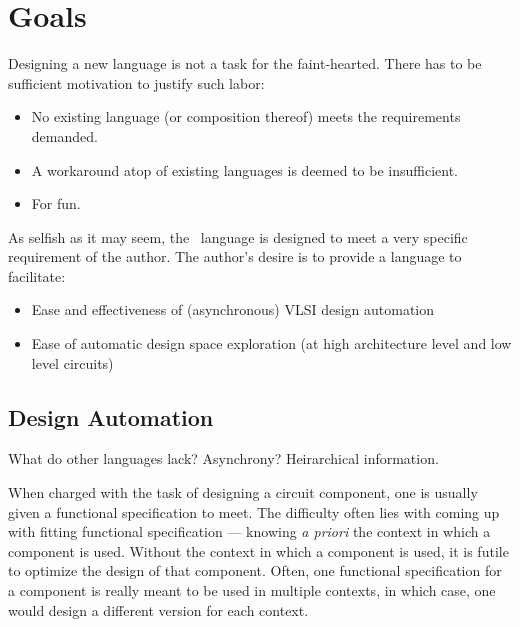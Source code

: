 

\chapter{Goals}
\label{sec:goals}

Designing a new language is not a task for the faint-hearted.  
There has to be sufficient motivation to justify such labor:

\begin{itemize}
\item No existing language (or composition thereof)
	meets the requirements demanded.  
\item A workaround atop of existing languages is deemed to be insufficient.
\item For fun.  
\end{itemize}

As selfish as it may seem, the \artxx\ language is designed to meet a very
specific requirement of the author.  
The author's desire is to provide a language to facilitate:

\begin{itemize}
\item Ease and effectiveness of (asynchronous) VLSI design automation
\item Ease of automatic design space exploration 
	(at high architecture level and low level circuits)
\end{itemize}

\section{Design Automation}
\label{sec:goals:EDA}

What do other languages lack?
Asynchrony?
Heirarchical information.  

When charged with the task of designing a circuit component, 
one is usually given a functional specification to meet.  
The difficulty often lies with coming up with fitting 
functional specification ---
knowing \emph{a priori} the context in which a component is used.  
Without the context in which a component is used, 
it is futile to optimize the design of that component.  
Often, one functional specification for a component is really 
meant to be used in multiple contexts, in which case, 
one would design a different version for each context.  

